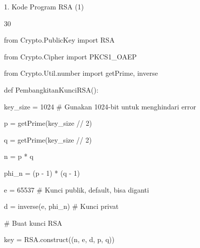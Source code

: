 \documentclass{article}
\begin{document}

1. Kode Program RSA (1)

30

from Crypto.PublicKey import RSA

from Crypto.Cipher import PKCS1\_OAEP

from Crypto.Util.number import getPrime, inverse

def PembangkitanKunciRSA():

    key\_size = 1024  \# Gunakan 1024-bit untuk menghindari error

    p = getPrime(key\_size // 2)

    q = getPrime(key\_size // 2)

    n = p * q

    phi\_n = (p - 1) * (q - 1)

    e = 65537  \# Kunci publik, default, bisa diganti

    d = inverse(e, phi\_n)  \# Kunci privat

    \# Buat kunci RSA

    key = RSA.construct((n, e, d, p, q))
\end{document}

